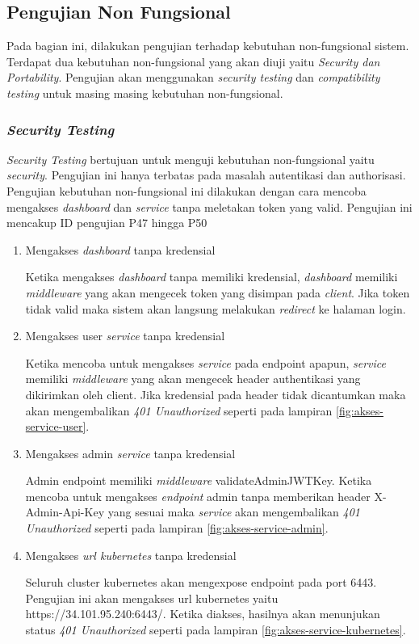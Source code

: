 \subsection{Pengujian Non Fungsional}
Pada bagian ini, dilakukan pengujian terhadap kebutuhan non-fungsional sistem. Terdapat dua kebutuhan non-fungsional yang akan diuji yaitu \textit{Security dan Portability}. Pengujian akan menggunakan \textit{security testing} dan \textit{compatibility testing} untuk masing masing kebutuhan non-fungsional.

\subsubsection{\textit{Security Testing}}
\textit{Security Testing} bertujuan untuk menguji kebutuhan non-fungsional yaitu \textit{security}. Pengujian ini hanya terbatas pada masalah autentikasi dan authorisasi. Pengujian kebutuhan non-fungsional ini dilakukan dengan cara mencoba mengakses \textit{dashboard} dan \textit{service} tanpa meletakan token yang valid. Pengujian ini mencakup ID pengujian P47 hingga P50

\begin{enumerate}
  \item Mengakses \textit{dashboard} tanpa kredensial

        Ketika mengakses \textit{dashboard} tanpa memiliki kredensial, \textit{dashboard} memiliki \textit{middleware} yang akan mengecek token yang disimpan pada \textit{client}. Jika token tidak valid maka sistem akan langsung melakukan \textit{redirect} ke halaman login.

  \item Mengakses user \textit{service} tanpa kredensial

        Ketika mencoba untuk mengakses \textit{service} pada endpoint apapun, \textit{service} memiliki \textit{middleware}
        yang akan mengecek header authentikasi yang dikirimkan oleh client. Jika kredensial pada header tidak dicantumkan maka akan mengembalikan \textit{401 Unauthorized} seperti pada lampiran \ref{fig:akses-service-user}.

  \item Mengakses admin \textit{service} tanpa kredensial

        Admin endpoint memiliki \textit{middleware} validateAdminJWTKey. Ketika mencoba untuk mengakses \textit{endpoint} admin tanpa memberikan header X-Admin-Api-Key yang sesuai maka \textit{service} akan mengembalikan \textit{401 Unauthorized} seperti pada lampiran \ref{fig:akses-service-admin}.

  \item Mengakses \textit{url kubernetes} tanpa kredensial

        Seluruh cluster kubernetes akan mengexpose endpoint pada port 6443. Pengujian ini akan mengakses url kubernetes yaitu https://34.101.95.240:6443/. Ketika diakses, hasilnya akan menunjukan status \textit{401 Unauthorized} seperti pada lampiran \ref{fig:akses-service-kubernetes}.

\end{enumerate}

